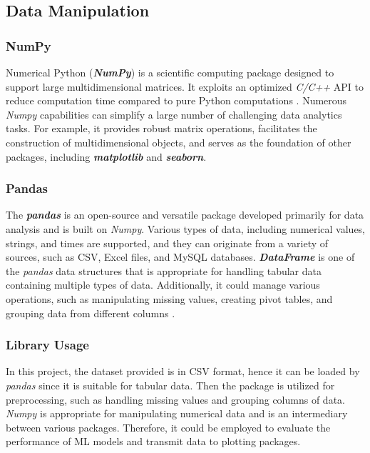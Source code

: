 \documentclass[12pt,twoside]{report}
\begin{document}
\subsection{Data Manipulation}
\subsubsection{NumPy}
Numerical Python (\textit{\textbf{NumPy}}) is a scientific computing package designed to support large multidimensional matrices. It exploits an optimized \textit{C/C++} API to reduce computation time compared to pure Python computations \citep{RN6}. Numerous \textit{Numpy} capabilities can simplify a large number of challenging data analytics tasks. For example, it provides robust matrix operations, facilitates the construction of multidimensional objects, and serves as the foundation of other packages, including \textbf{\textit{matplotlib}} and \textbf{\textit{seaborn}}.

\subsubsection{Pandas}
The \textbf{\textit{pandas}} is an open-source and versatile package developed primarily for data analysis and is built on \textit{Numpy}. Various types of data, including numerical values, strings, and times are supported, and they can originate from a variety of sources, such as CSV, Excel files, and MySQL databases. \textbf{\textit{DataFrame}} is one of the \textit{pandas} data structures that is appropriate for handling tabular data containing multiple types of data. Additionally, it could manage various operations, such as manipulating missing values, creating pivot tables, and grouping data from different columns \citep{RN4}. 

\subsubsection{Library Usage}
In this project, the dataset provided is in CSV format, hence it can be loaded by \textit{pandas} since it is suitable for tabular data. Then the package is utilized for preprocessing, such as handling missing values and grouping columns of data. 
\\

\textit{Numpy} is appropriate for manipulating numerical data and is an intermediary between various packages. Therefore, it could be employed to evaluate the performance of ML models and transmit data to plotting packages. 
\end{document}
